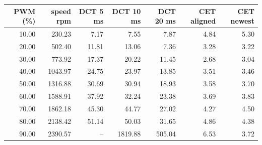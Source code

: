 \begin{tabular}{@{}rrrrrrr@{}}
\toprule
PWM (\%) & speed rpm & DCT 5 ms & DCT 10 ms & DCT 20 ms & CET aligned & CET newest \\
\midrule
10.00 & 230.23 & 7.17 & 7.55 & 7.87 & 4.84 & 5.30 \\
20.00 & 502.40 & 11.81 & 13.06 & 7.36 & 3.28 & 3.22 \\
30.00 & 773.92 & 17.37 & 20.22 & 11.45 & 2.68 & 3.04 \\
40.00 & 1043.97 & 24.75 & 23.97 & 13.85 & 3.51 & 3.46 \\
50.00 & 1316.88 & 30.69 & 30.94 & 18.93 & 3.58 & 3.70 \\
60.00 & 1588.91 & 37.92 & 32.24 & 23.38 & 3.69 & 3.83 \\
70.00 & 1862.18 & 45.30 & 44.77 & 27.02 & 4.27 & 4.50 \\
80.00 & 2138.42 & 51.14 & 50.03 & 31.65 & 4.86 & 4.38 \\
90.00 & 2390.57 & -- & 1819.88 & 505.04 & 6.53 & 3.72 \\
\bottomrule
\end{tabular}
